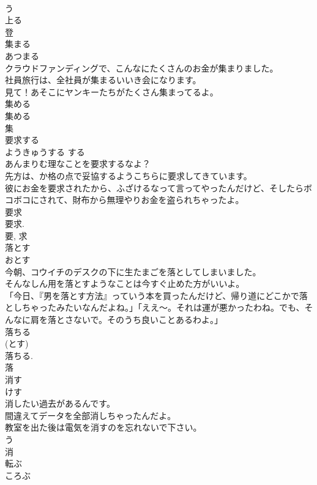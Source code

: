 \documentclass[8pt]{extreport}
\begin{document}
\begin{CJK}{UTF8}{min}
\\	う 
\\	上る 
\\	登	
\\	集まる	
\\	あつまる	
\\	クラウドファンディングで、こんなにたくさんのお金が集まりました。	
\\	社員旅行は、全社員が集まるいいき会になります。	
\\	見て！あそこにヤンキーたちがたくさん集まってるよ。	
\\	集める 
\\	集める 
\\	集	
\\	要求する	
\\	ようきゅうする	する 
\\	あんまりむ理なことを要求するなよ？	
\\	先方は、か格の点で妥協するようこちらに要求してきています。	
\\	彼にお金を要求されたから、ふざけるなって言ってやったんだけど、そしたらボコボコにされて、財布から無理やりお金を盗られちゃったよ。	
\\	要求 
\\	要求. 
\\	要, 求	
\\	落とす	
\\	おとす	
\\	今朝、コウイチのデスクの下に生たまごを落としてしまいました。	
\\	そんなしん用を落とすようなことは今すぐ止めた方がいいよ。	
\\	「今日、『男を落とす方法』っていう本を買ったんだけど、帰り道にどこかで落としちゃったみたいなんだよね。」「ええ〜。それは運が悪かったわね。でも、そんなに肩を落とさないで。そのうち良いことあるわよ。」	
\\	落ちる 
\\	(とす) 
\\	落ちる. 
\\	落	
\\	消す	
\\	けす	
\\	消したい過去があるんです。	
\\	間違えてデータを全部消しちゃったんだよ。	
\\	教室を出た後は電気を消すのを忘れないで下さい。	
\\	う 
\\	消	
\\	転ぶ	
\\	ころぶ	

\end{CJK}
\end{document}
